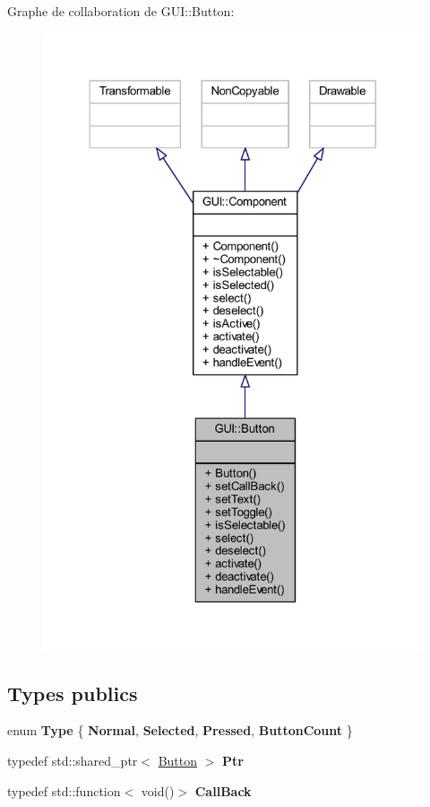 Graphe de collaboration de G\+UI\+:\+:Button\+:\nopagebreak
\begin{figure}[H]
\begin{center}
\leavevmode
\includegraphics[width=324pt]{class_g_u_i_1_1_button__coll__graph}
\end{center}
\end{figure}
\subsection*{Types publics}
\begin{DoxyCompactItemize}
\item 
\hypertarget{class_g_u_i_1_1_button_a405149f049ffc8144e11e73fec3bae96}{}\label{class_g_u_i_1_1_button_a405149f049ffc8144e11e73fec3bae96} 
enum {\bfseries Type} \{ {\bfseries Normal}, 
{\bfseries Selected}, 
{\bfseries Pressed}, 
{\bfseries Button\+Count}
 \}
\item 
\hypertarget{class_g_u_i_1_1_button_a910df9f7797f35d65b43da4dd392f1de}{}\label{class_g_u_i_1_1_button_a910df9f7797f35d65b43da4dd392f1de} 
typedef std\+::shared\+\_\+ptr$<$ \hyperlink{class_g_u_i_1_1_button}{Button} $>$ {\bfseries Ptr}
\item 
\hypertarget{class_g_u_i_1_1_button_a7f3887a6bc45f72fec7dd56c639f563d}{}\label{class_g_u_i_1_1_button_a7f3887a6bc45f72fec7dd56c639f563d} 
typedef std\+::function$<$ void()$>$ {\bfseries Call\+Back}
\end{DoxyCompactItemize}
